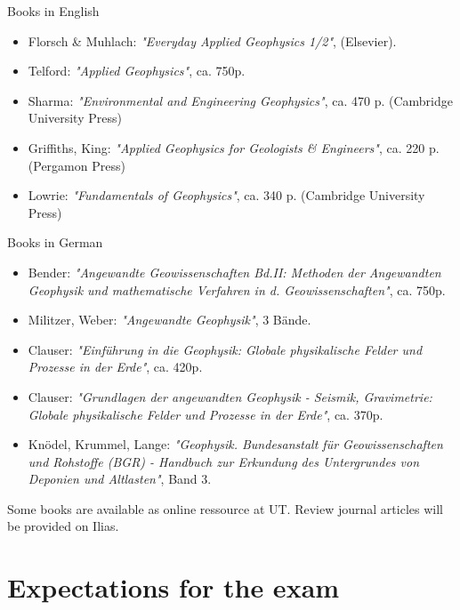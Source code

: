 \documentclass[letterpaper]{inzane_syllabus} %
\begin{document}
{\color{myCOLOR} Books in English}\\
\begin{itemize} 
\item Florsch \& Muhlach: \textit{"Everyday Applied Geophysics 1/2"}, (Elsevier).
    
\item Telford: \textit{"Applied Geophysics"}, ca. 750p. 

\item Sharma: \textit{"Environmental and Engineering Geophysics"}, ca. 470 p. (Cambridge University Press)

\item Griffiths, King: \textit{"Applied Geophysics for Geologists \& Engineers"}, ca. 220 p. (Pergamon Press)

\item Lowrie: \textit{"Fundamentals of Geophysics"}, ca. 340 p. (Cambridge University Press)
\end{itemize}
{\color{myCOLOR} Books in German}\\
\begin{itemize}
\item Bender: \textit{"Angewandte Geowissenschaften Bd.II: Methoden der Angewandten Geophysik und mathematische Verfahren in d. Geowissenschaften"}, ca. 750p. 

\item Militzer, Weber: \textit{"Angewandte Geophysik"}, 3 Bände. 

\item Clauser: \textit{"Einführung in die Geophysik: Globale physikalische Felder und Prozesse in der Erde"}, ca. 420p. 

\item Clauser: \textit{"Grundlagen der angewandten Geophysik - Seismik, Gravimetrie: Globale physikalische Felder und Prozesse in der Erde"}, ca. 370p. 

\item Knödel, Krummel, Lange: \textit{"Geophysik. Bundesanstalt für Geowissenschaften und Rohstoffe (BGR) - Handbuch zur Erkundung des Untergrundes von Deponien und Altlasten"}, Band 3. \\
\end{itemize}

Some books are available as online ressource at UT. Review journal articles will be provided on Ilias. 





\section{Expectations for the exam}
\end{document}
